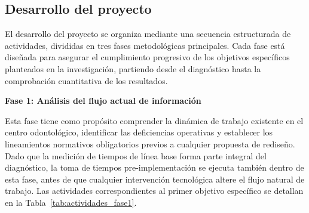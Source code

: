 \subsection{Desarrollo del proyecto}

El desarrollo del proyecto se organiza mediante una secuencia
estructurada de actividades, divididas en tres fases metodológicas
principales. Cada fase está diseñada para asegurar el cumplimiento
progresivo de los objetivos específicos planteados en la
investigación, partiendo desde el diagnóstico hasta la comprobación
cuantitativa de los resultados.

\bigskip
\noindent\textbf{Fase 1: Análisis del flujo actual de información}

\smallskip
Esta fase tiene como propósito comprender la dinámica de trabajo
existente en el centro odontológico, identificar las deficiencias
operativas y establecer los lineamientos normativos obligatorios
previos a cualquier propuesta de rediseño. Dado que la medición de
tiempos de línea base forma parte integral del diagnóstico, la
toma de tiempos pre-implementación se ejecuta también dentro de
esta fase, antes de que cualquier intervención tecnológica altere
el flujo natural de trabajo. Las actividades correspondientes al
primer objetivo específico se detallan en la
Tabla~\ref{tab:actividades_fase1}.


